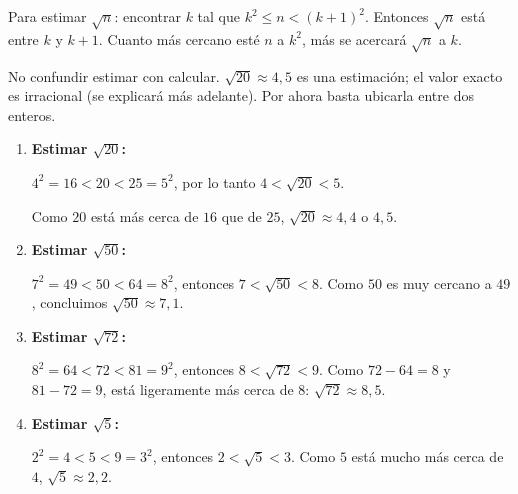 \documentclass[11pt, letterpaper]{article}
\begin{document}
\begin{tcolorbox}[importantbox, title={Idea clave}]
Para estimar $\sqrt{n}$: encontrar $k$ tal que $k^2 \leq n < (k+1)^2$. Entonces $\sqrt{n}$ está entre $k$ y $k+1$. Cuanto más cercano esté $n$ a $k^2$, más se acercará $\sqrt{n}$ a $k$.
\end{tcolorbox}

\begin{tcolorbox}[warningbox, title={Cuidado}]
No confundir estimar con calcular. $\sqrt{20} \approx 4{,}5$ es una estimación; el valor exacto es irracional (se explicará más adelante). Por ahora basta ubicarla entre dos enteros.
\end{tcolorbox}

\begin{tcolorbox}[examplebox, title={Ejemplos}]
\begin{enumerate}[label=\textbf{Ej. \arabic*.}, leftmargin=*]

\item \textbf{Estimar $\sqrt{20}$:}

$4^2 = 16 < 20 < 25 = 5^2$, por lo tanto $4 < \sqrt{20} < 5$.

Como $20$ está más cerca de $16$ que de $25$, $\sqrt{20} \approx 4{,}4$ o $4{,}5$.

\begin{center}
\end{center}

\item \textbf{Estimar $\sqrt{50}$:}

$7^2=49 < 50 < 64=8^2$, entonces $7 < \sqrt{50} < 8$. Como $50$ es muy cercano a $49$, concluimos $\sqrt{50} \approx 7{,}1$.

\item \textbf{Estimar $\sqrt{72}$:}

$8^2=64 < 72 < 81=9^2$, entonces $8 < \sqrt{72} < 9$. Como $72-64=8$ y $81-72=9$, está ligeramente más cerca de 8: $\sqrt{72} \approx 8{,}5$.

\item \textbf{Estimar $\sqrt{5}$:}

$2^2=4 < 5 < 9=3^2$, entonces $2 < \sqrt{5} < 3$. Como $5$ está mucho más cerca de $4$, $\sqrt{5} \approx 2{,}2$.


\end{enumerate}
\end{tcolorbox}
\end{document}
